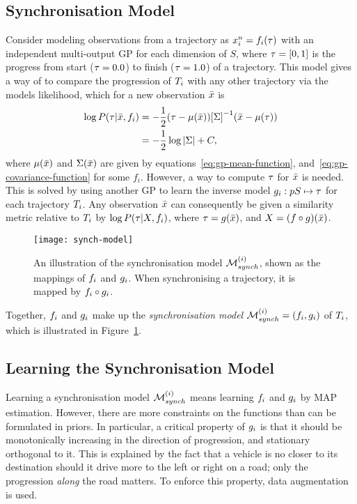 \subsection{Synchronisation Model}
Consider modeling observations from a trajectory as $x_{i}^{n} = f_{i}(\tau)$ with an independent
multi-output GP for each dimension of $S$, where
$\tau = [0, 1]$ is the progress from
start ($\tau = 0.0$) to finish ($\tau = 1.0$) of
a trajectory. This model gives a way of to compare the
progression of $T_{i}$ with any other trajectory via the models likelihood, which for
a new observation $\bar{x}$ is
\begin{equation}
  \label{eq:model-log-likelihood}
  \begin{split}
    \log P(\tau|\bar{x}, {f_{i}}) & = -\frac{1}{2}(\tau - \mu(\bar{x})){[\Sigma]}^{-1}(\bar{x} - \mu(\tau)) \\
    & = -\frac{1}{2}\log{|\Sigma|}+C,
  \end{split}
\end{equation}
where $\mu(\bar{x})$ and $\Sigma(\bar{x})$ are given by
equations~\ref{eq:gp-mean-function},
and~\ref{eq:gp-covariance-function} for some $f_{i}$.
However, a way to compute $\tau$ for $\bar{x}$ is needed. This
is solved by using another GP to learn the inverse model $g_{i} :
pS \mapsto \tau$ for each trajectory $T_{i}$.
Any observation $\bar{x}$ can consequently be given a similarity metric
relative to $T_{i}$ by $\log P(\tau|X,
{f_{i}})$, where $\tau = g(\bar{x})$, and
$X = (f \circ g)(\bar{x})$.
\begin{figure}
  \centering
  \texttt{[image: synch-model]}
  \caption{An illustration of the synchronisation model $\mathcal{M}_{synch}^{(i)}$, shown as 
    the mappings of $f_i$ and $g_i$. When synchronising a trajectory,
    it is mapped by $f_i \circ g_i$.}\label{fig:synch-model}
\end{figure}
Together, $f_{i}$ and $g_{i}$ make up the \textit{synchronisation
  model} $\mathcal{M}_{synch}^{(i)} = (f_{i},  g_{i})$ of $T_{i}$,
which is illustrated in Figure~\ref{fig:synch-model}.

\subsection{Learning the Synchronisation Model}
Learning a synchronisation model $\mathcal{M}_{synch}^{(i)}$ means learning
$f_{i}$ and $g_{i}$ by MAP estimation. However, there are
more constraints on the functions than can be formulated in
priors. In particular, a critical property of $g_{i}$ 
is that it should be monotonically increasing in the direction of progression,
and stationary orthogonal to it. This is explained by the fact that a
vehicle is no closer to its destination should it drive more to the
left or right on a road; only the progression \textit{along} the road matters.
To enforce this property, data augmentation is used. 

